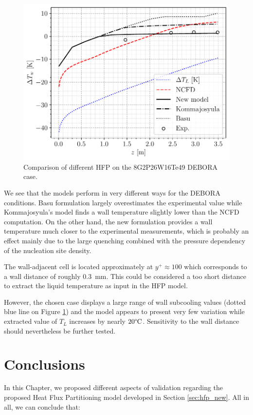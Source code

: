 \begin{figure}[!h]
\centering
\includegraphics[width=0.6\linewidth]{img/HFP/test_allHFP_8Te44.pdf}
\caption{Comparison of different HFP on the 8G2P26W16Te49 DEBORA case.}
\label{fig:HFP_DEBORA}
\end{figure}

We see that the models perform in very different ways for the DEBORA conditions. Basu \etal formulation largely overestimates the experimental value while Kommajosyula's model finds a wall temperature slightly lower than the NCFD computation. On the other hand, the new formulation provides a wall temperature much closer to the experimental measurements, which is probably an effect mainly due to the large quenching combined with the pressure dependency of the nucleation site density.

\begin{remark*}{}
The wall-adjacent cell is located approximately at $y^{+} \approx 100$ which corresponds to a wall distance of roughly 0.3~mm. This could be considered a too short distance to extract the liquid temperature as input in the HFP model. 

\npar

However, the chosen case displays a large range of wall subcooling values (dotted blue line on Figure \ref{fig:HFP_DEBORA}) and the model appears to present very few variation while extracted value of $T_{L}$ increases by nearly $20\degree\mathrm{C}$. Sensitivity to the wall distance should nevertheless be further tested.
\end{remark*}



\section{Conclusions}

In this Chapter, we proposed different aspects of validation regarding the proposed Heat Flux Partitioning model developed in Section \ref{sec:hfp_new}. All in all, we can conclude that:

